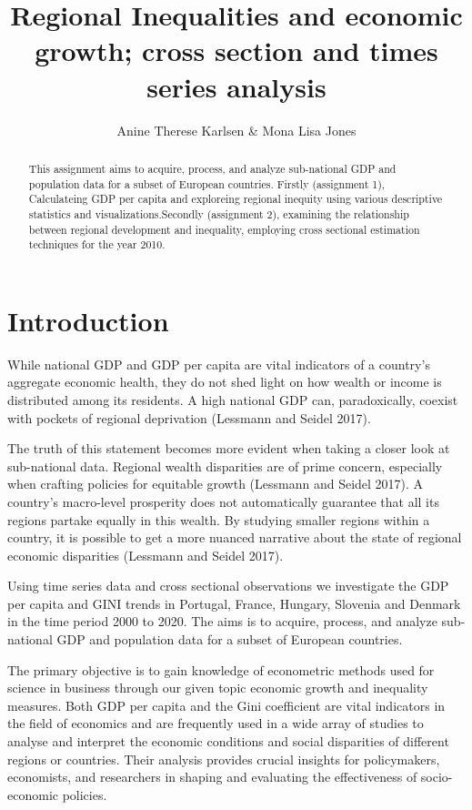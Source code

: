 \documentclass[
  a4paper,
  DIV=11,
  numbers=noendperiod]{scrartcl}
\title{Regional Inequalities and economic growth; cross section and
times series analysis}
\author{Anine Therese Karlsen \& Mona Lisa Jones}
\date{}
\begin{document}
\maketitle
\begin{abstract}
This assignment aims to acquire, process, and analyze sub-national GDP
and population data for a subset of European countries. Firstly
(assignment 1), Calculateing GDP per capita and exploreing regional
inequity using various descriptive statistics and
visualizations.Secondly (assignment 2), examining the relationship
between regional development and inequality, employing cross sectional
estimation techniques for the year 2010.
\end{abstract}
\ifdefined\Shaded\renewenvironment{Shaded}{\begin{tcolorbox}[boxrule=0pt, frame hidden, interior hidden, borderline west={3pt}{0pt}{shadecolor}, sharp corners, enhanced, breakable]}{\end{tcolorbox}}\fi

\hypertarget{introduction}{%
\section{Introduction}\label{introduction}}

While national GDP and GDP per capita are vital indicators of a
country's aggregate economic health, they do not shed light on how
wealth or income is distributed among its residents. A high national GDP
can, paradoxically, coexist with pockets of regional deprivation
(Lessmann and Seidel 2017).

The truth of this statement becomes more evident when taking a closer
look at sub-national data. Regional wealth disparities are of prime
concern, especially when crafting policies for equitable growth
(Lessmann and Seidel 2017). A country's macro-level prosperity does not
automatically guarantee that all its regions partake equally in this
wealth. By studying smaller regions within a country, it is possible to
get a more nuanced narrative about the state of regional economic
disparities (Lessmann and Seidel 2017).

Using time series data and cross sectional observations we investigate
the GDP per capita and GINI trends in Portugal, France, Hungary,
Slovenia and Denmark in the time period 2000 to 2020. The aims is to
acquire, process, and analyze sub-national GDP and population data for a
subset of European countries.

The primary objective is to gain knowledge of econometric methods used
for science in business through our given topic economic growth and
inequality measures. Both GDP per capita and the Gini coefficient are
vital indicators in the field of economics and are frequently used in a
wide array of studies to analyse and interpret the economic conditions
and social disparities of different regions or countries. Their analysis
provides crucial insights for policymakers, economists, and researchers
in shaping and evaluating the effectiveness of socio-economic policies.
\end{document}
